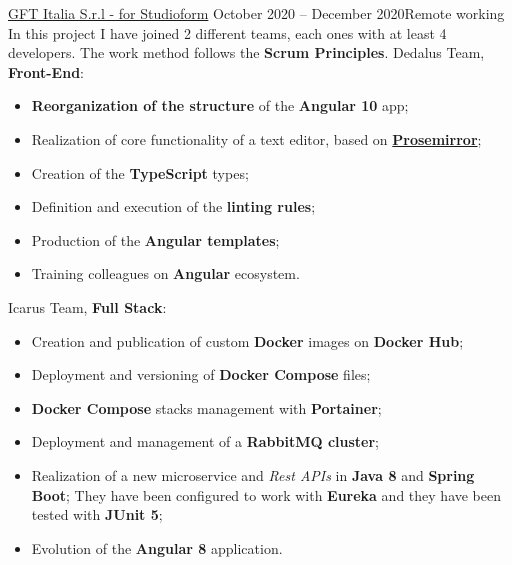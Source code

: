 \documentclass[10pt,a4paper]{altacv}
\begin{document}
{\marginpar{\raggedright}}
{\href{https://studioform.org/}{GFT Italia S.r.l - for Studioform}}
{October 2020 -- December 2020}{Remote working}
In this project I have joined 2 different teams, each ones with at least 4 developers.
\newline
The work method follows the \textbf{Scrum Principles}.
\newline\newline
Dedalus Team, \textbf{Front-End}:
\begin{itemize}
	\item \textbf{Reorganization of the structure} of the \textbf{Angular 10} app;
	\item Realization of core functionality of a text editor, based on \textbf{\href{https://prosemirror.net/}{Prosemirror}};
	\item Creation of the \textbf{TypeScript} types;
	\item Definition and execution of the \textbf{linting rules};
	\item Production of the \textbf{Angular templates};
	\item Training colleagues on \textbf{Angular} ecosystem.
\end{itemize}
\leavevmode \newline
Icarus Team, \textbf{Full Stack}:
\begin{itemize}
	\item Creation and publication of custom \textbf{Docker} images on \textbf{Docker Hub};
	\item Deployment and versioning of \textbf{Docker Compose} files;
	\item \textbf{Docker Compose} stacks management with \textbf{Portainer};
	\item Deployment and management of a \textbf{RabbitMQ cluster};
	\item Realization of a new microservice and \textit{Rest APIs} in \textbf{Java 8} and \textbf{Spring Boot};
	They have been configured to work with \textbf{Eureka} and they have been tested with \textbf{JUnit 5};
	\item Evolution of the \textbf{Angular 8} application.
\end{itemize}
\divider
\end{document}
